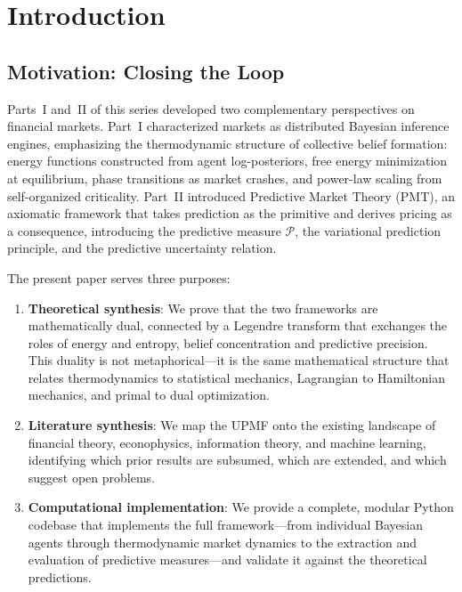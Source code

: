 \documentclass[12pt,a4paper]{article}
\theoremstyle{definition}
\newcommand{\PP}{\mathcal{P}}
\begin{document}

\section{Introduction}\label{sec:intro}

\subsection{Motivation: Closing the Loop}

Parts~I and~II of this series developed two complementary perspectives on financial markets. Part~I \citep{long2026part1} characterized markets as distributed Bayesian inference engines, emphasizing the thermodynamic structure of collective belief formation: energy functions constructed from agent log-posteriors, free energy minimization at equilibrium, phase transitions as market crashes, and power-law scaling from self-organized criticality. Part~II \citep{long2026part2} introduced Predictive Market Theory (PMT), an axiomatic framework that takes prediction as the primitive and derives pricing as a consequence, introducing the predictive measure $\PP$, the variational prediction principle, and the predictive uncertainty relation.

The present paper serves three purposes:

\begin{enumerate}[label=(\roman*)]
    \item \textbf{Theoretical synthesis}: We prove that the two frameworks are mathematically dual, connected by a Legendre transform that exchanges the roles of energy and entropy, belief concentration and predictive precision. This duality is not metaphorical---it is the same mathematical structure that relates thermodynamics to statistical mechanics, Lagrangian to Hamiltonian mechanics, and primal to dual optimization.
    
    \item \textbf{Literature synthesis}: We map the UPMF onto the existing landscape of financial theory, econophysics, information theory, and machine learning, identifying which prior results are subsumed, which are extended, and which suggest open problems.
    
    \item \textbf{Computational implementation}: We provide a complete, modular Python codebase that implements the full framework---from individual Bayesian agents through thermodynamic market dynamics to the extraction and evaluation of predictive measures---and validate it against the theoretical predictions.
\end{enumerate}
\end{document}
